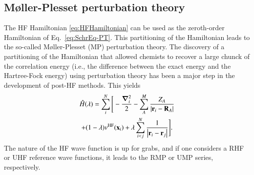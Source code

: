 \documentclass[aps,prb,reprint,noshowkeys,superscriptaddress]{revtex4-1}
\newcommand{\titou}[1]{\textcolor{red}{#1}}
\newcommand{\latin}[1]{#1}
\newcommand{\ie}{\latin{i.e.}}
\newcommand{\hH}{\Hat{H}}
\begin{document}

\subsection{M{\o}ller-Plesset perturbation theory}

The HF Hamiltonian \eqref{eq:HFHamiltonian} can be used as the zeroth-order Hamiltonian of Eq.~\eqref{eq:SchrEq-PT}. This partitioning of the Hamiltonian leads to the so-called M{\o}ller-Plesset (MP) perturbation theory. \cite{Moller_1934} 
The discovery of a partitioning of the Hamiltonian that allowed chemists to recover a large chunck of the correlation energy (\ie, the difference between the exact energy and the Hartree-Fock energy) using perturbation theory has been a major step in the development of post-HF methods. 
This yields
\begin{multline}\label{eq:MPHamiltonian}
    \hH(\lambda) = 
    \sum_{i}^{N} \Bigg[ 
    -\frac{\grad_i^2}{2} 
    - \sum_{A}^{M} \frac{Z_A}{\abs{\vb{r}_i-\vb{R}_A}} 
    \\
    + (1-\lambda) v^{\text{HF}}(\vb{x}_i) 
    + \lambda\sum_{i<j}^{N}\frac{1}{\abs{\vb{r}_i-\vb{r}_j}} 
    \Bigg].
\end{multline}
The nature of the HF wave function is up for grabs, and if one considers a RHF or UHF reference wave functions, it leads to the RMP or UMP series, respectively.
\end{document}
